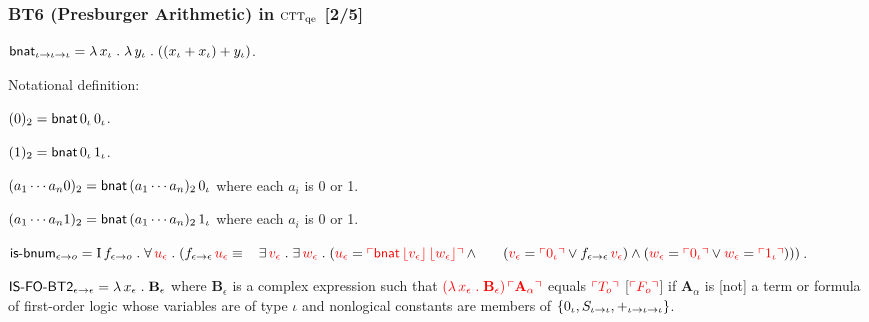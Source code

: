\documentclass[t,12pt,numbers,fleqn]{beamer}
\newcommand{\churchqe}{$\mbox{\sc ctt}_{\rm qe}$}
\newcommand{\syn}[1]{\textcolor{red}{#1}}
\begin{document}
\begin{frame}
\frametitle{BT6 (Presburger Arithmetic) in {\churchqe} [2/5]}
\small
\vspace{-2ex}
\bi

  \item[] 

  \be

    \setcounter{enumi}{2}

    \item $\mbox{\sf bnat}_{\iota \rightarrow \iota \rightarrow \iota} =
      \lambda\, x_\iota \mathrel. \lambda\, y_\iota \mathrel. ((x_\iota +
      x_\iota) + y_\iota)$.
      
    Notational definition:

    \bi

      \item[] $(0)_2 = \mbox{\sf bnat} \, 0_\iota \, 0_\iota$.
  
      \item[] $(1)_2 = \mbox{\sf bnat} \, 0_\iota \, 1_\iota$.
  
      \item[] $(a_1 \cdots a_n0)_2 = \mbox{\sf bnat} \, (a_1 \cdots
        a_n)_2 \, 0_\iota$ {\sglsp} where each $a_i$ is 0 or 1.
  
      \item[] $(a_1 \cdots a_n1)_2 = \mbox{\sf bnat} \, (a_1 \cdots
        a_n)_2 \, 1_\iota$ {\sglsp} where each $a_i$ is 0 or 1.
  
    \ei

    \item $\mname{is-bnum}_{\epsilon \tarrow o} = 
      \IotaApp f_{\epsilon \tarrow o} \mdot
      \ForallApp \syn{u_\epsilon} \mdot
      (f_{\epsilon \tarrow \epsilon} \, \syn{u_\epsilon} \Iff {}\newline
      \hspace*{2ex}\ForsomeApp \syn{v_\epsilon} \mdot 
      \ForsomeApp \syn{w_\epsilon} \mdot
      (\syn{u_\epsilon} = \syn{\synbrack{\mname{bnat} \, 
      \commabrack{v_\epsilon} \, \commabrack{w_\epsilon}}} \Andd {}\newline
      \hspace*{4ex}(\syn{v_\epsilon} = \syn{\synbrack{0_\iota}} \Orr
      f_{\epsilon \tarrow \epsilon} \, \syn{v_\epsilon}) \Andd
      (\syn{w_\epsilon} = \syn{\synbrack{0_\iota}} \Orr
      \syn{w_\epsilon} =
      \syn{\synbrack{1_\iota}})))$.

    \item $\mbox{\sf IS-FO-BT2}_{\epsilon \rightarrow \epsilon} = \lambda\,
      x_\epsilon \mathrel. \textbf{B}_\epsilon$ {\sglsp} where
      $\textbf{B}_\epsilon$ is a complex expression such that
      $\syn{(\LambdaApp x_\epsilon \mdot \textbf{B}_\epsilon) \,
        \synbrack{\textbf{A}_\alpha}}$ equals $\syn{\synbrack{T_o}}$
      [$\syn{\synbrack{F_o}}$] if $\textbf{A}_\alpha$ is [not] a term
      or formula of first-order logic whose variables are of type
      $\iota$ and nonlogical constants are members of
      ${\{ 0_\iota,S_{\iota \rightarrow \iota},+_{\iota \rightarrow \iota
          \rightarrow \iota} \}}$.


\end{frame}
\end{document}
